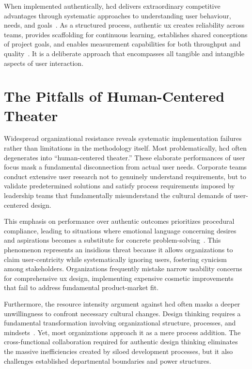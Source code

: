 \documentclass[11pt,showkeys]{essay}
\begin{document}
When implemented authentically, \gls{hcd} delivers extraordinary competitive advantages through systematic approaches to understanding user behaviour, needs, and goals~\cite{norman_design_2013}. As a structured process, authentic \gls{ux} creates reliability across teams, provides scaffolding for continuous learning, establishes shared conceptions of project goals, and enables measurement capabilities for both throughput and quality~\cite{gulliksen_key_2003}. It is a deliberate approach that encompasses all tangible and intangible aspects of user interaction.

\section{The Pitfalls of Human-Centered Theater}

Widespread organizational resistance reveals systematic implementation failures rather than limitations in the methodology itself. Most problematically, \gls{hcd} often degenerates into ``human-centered theater.'' These elaborate performances of user focus mask a fundamental disconnection from actual user needs. Corporate teams conduct extensive user research not to genuinely understand requirements, but to validate predetermined solutions and satisfy process requirements imposed by leadership teams that fundamentally misunderstand the cultural demands of user-centered design.

This emphasis on performance over authentic outcomes prioritizes procedural compliance, leading to situations where emotional language concerning desires and aspirations becomes a substitute for concrete problem-solving~\cite{kolko_design_2015}. This phenomenon represents an insidious threat because it allows organizations to claim user-centricity while systematically ignoring users, fostering cynicism among stakeholders. Organizations frequently mistake narrow usability concerns for comprehensive \gls{ux} design, implementing expensive cosmetic improvements that fail to address fundamental product-market fit. 

Furthermore, the resource intensity argument against \gls{hcd} often masks a deeper unwillingness to confront necessary cultural changes. Design thinking requires a fundamental transformation involving organizational structure, processes, and mindsets~\cite{elsbach_design_2018}. Yet, most organizations approach it as a mere process addition. The cross-functional collaboration required for authentic design thinking eliminates the massive inefficiencies created by siloed development processes, but it also challenges established departmental boundaries and power structures.
\end{document}
